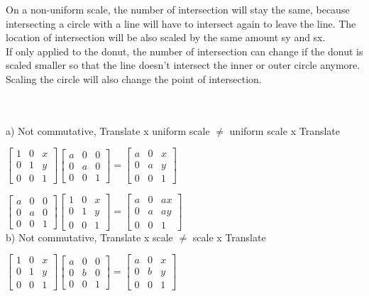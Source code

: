 \documentclass[12pt,a4paper]{article}
\begin{document}
On a non-uniform scale, the number of intersection will stay the same, because intersecting a circle with a line will have to intersect again to leave the line. The location of intersection will be also scaled by the same amount sy and sx.
\\

If only applied to the donut, the number of intersection can change if the donut is scaled smaller so that the line doesn't intersect the inner or outer circle anymore. Scaling the circle will also change the point of intersection.

\section{}
${}$

a) Not commutative, Translate x uniform scale $\neq$ uniform scale x Translate

$
\begin{bmatrix}
1 &0 &x\\
0 &1& y\\
0 &0& 1
\end{bmatrix}
\begin{bmatrix}
a&0&0\\
0&a&0\\
0&0&1
\end{bmatrix} = \begin{bmatrix}
a&0&x\\
0&a&y\\
0&0&1
\end{bmatrix}$

$
\begin{bmatrix}
a&0&0\\
0&a&0\\
0&0&1
\end{bmatrix}
\begin{bmatrix}
1 &0 &x\\
0 &1& y\\
0 &0& 1
\end{bmatrix}
 = \begin{bmatrix}
a&0&ax\\
0&a&ay\\
0&0&1
\end{bmatrix}$
\\

b) Not commutative, Translate x scale $\neq$ scale x Translate

$
\begin{bmatrix}
1 &0 &x\\
0 &1& y\\
0 &0& 1
\end{bmatrix}
\begin{bmatrix}
a&0&0\\
0&b&0\\
0&0&1
\end{bmatrix} = \begin{bmatrix}
a&0&x\\
0&b&y\\
0&0&1
\end{bmatrix}$
\end{document}
